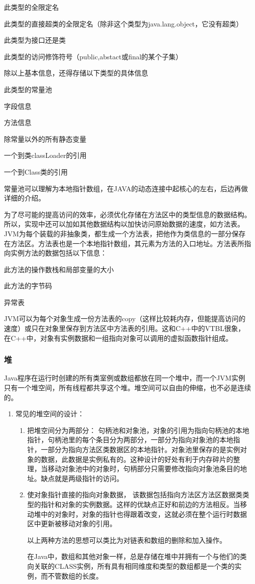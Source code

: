 \documentclass[10pt,b5paper]{article}
\begin{document}
此类型的全限定名

此类型的直接超类的全限定名（除非这个类型为java.lang.object，它没有超类）

此类型为接口还是类

此类型的访问修饰符号（public,abstact或final的某个子集）

除以上基本信息，还得存储以下类型的具体信息

此类型的常量池

字段信息

方法信息

除常量以外的所有静态变量

一个到类classLoader的引用

一个到Class类的引用

常量池可以理解为本地指针数组，在JAVA的动态连接中起核心的左右，后边再做详细的介绍。

为了尽可能的提高访问的效率，必须优化存储在方法区中的类型信息的数据结构。所以，实现中还可以加如其他数据结构以加快访问原始数据的速度，如方法表。JVM为每个装载的非抽象类，都生成一个方法表，把他作为类信息的一部分保存在方法区。方法表也是一个本地指针数组，其元素为方法的入口地址。方法表所指向实例方法的数据包括以下信息：

此方法的操作数栈和局部变量的大小

此方法的字节码

异常表

JVM可以为每个对象生成一份方法表的copy（这样比较耗内存，但能提高访问的速度）或只在对象里保存到方法区中方法表的引用。这和C++中的VTBL很象，在C++中，对象有实例数据和一组指向对象可以调用的虚拟函数指针组成。
\subsubsection{堆}
\label{sec-3-1-2}

Java程序在运行时创建的所有类室例或数组都放在同一个堆中，而一个JVM实例只有一个堆空间，所有线程都共享这个堆。堆空间可以自由的伸缩，也不必是连续的。

\begin{enumerate}
\item 常见的堆空间的设计：
\label{sec-3-1-2-1}

\begin{enumerate}
\item 把堆空间分为两部分：
\label{sec-3-1-2-1-1}
句柄池和对象池，对象的引用为指向句柄池的本地指针，句柄池里的每个条目分为两部分，一部分为指向对象池的本地指针，一部分为指向方法区类数据区的本地指针。对象池里保存的是实例对象的数据，此数据是实例私有的。这种设计的好处有利于内存碎片的整理，当移动对象池中的对象时，句柄部分只需要修改指向对象池条目的地址。缺点就是两级指针的访问。
\item 使对象指针直接的指向对象数据，
\label{sec-3-1-2-1-2}
该数据包括指向方法区方法区数据类类型的指针和对象的实例数据。这样的优缺点正好和前边的方法相反。当移动堆中的对象时，对象的指针也得跟着改变，这就必须在整个运行时数据区中更新被移动对象的引用。

以上两种方法的思想可以类比为对链表和数组的删除和加入操作。

在Java中，数组和其他对象一样，总是存储在堆中并拥有一个与他们的类向关联的CLASS实例，所有具有相同维度和类型的数组都是一个类的实例，而不管数组的长度。
\end{enumerate}
\end{enumerate}
\end{document}

